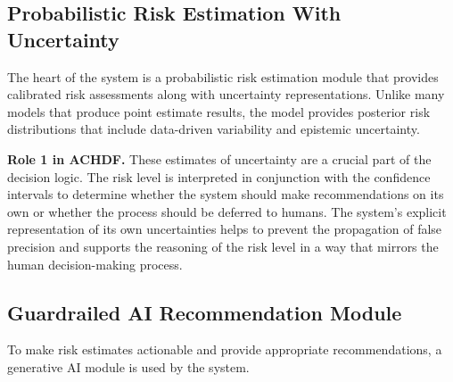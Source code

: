 \documentclass[journal]{IEEEtran}
\theoremstyle{plain}
\theoremstyle{definition}
\begin{document}
    \subsection{Probabilistic Risk Estimation With Uncertainty}
    The heart of the system is a probabilistic risk estimation module that provides calibrated risk assessments along with uncertainty representations. Unlike many models that produce point estimate results, the model provides posterior risk distributions that include data-driven variability and epistemic uncertainty.

    \textbf{Role 1 in ACHDF.}
    These estimates of uncertainty are a crucial part of the decision logic. The risk level is interpreted in conjunction with the confidence intervals to determine whether the system should make recommendations on its own or whether the process should be deferred to humans. The system’s explicit representation of its own uncertainties helps to prevent the propagation of false precision and supports the reasoning of the risk level in a way that mirrors the human decision-making process.

    \subsection{Guardrailed AI Recommendation Module}
    To make risk estimates actionable and provide appropriate recommendations, a generative AI module is used by the system.
\end{document}
